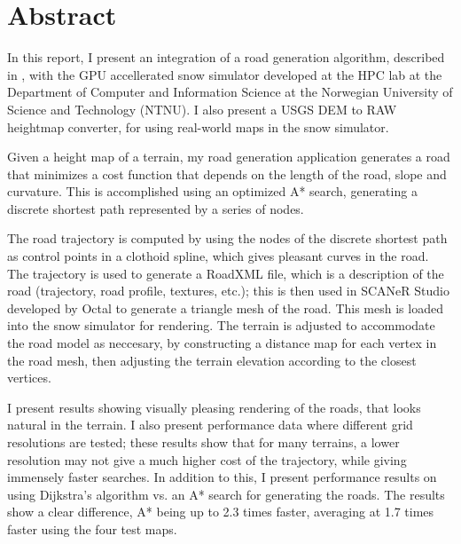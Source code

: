 \chapter*{Abstract}

In this report, I present an integration of a road generation algorithm, described in \cite{roadgen}, with the GPU accellerated snow simulator developed at the HPC lab at the Department of Computer and Information Science at the Norwegian University of Science and Technology (NTNU). I also present a USGS DEM to RAW heightmap converter, for using real-world maps in the snow simulator. 

Given a height map of a terrain, my road generation application generates a road that minimizes a cost function that depends on the length of the road, slope and curvature. This is accomplished using an optimized A* search, generating a discrete shortest path represented by a series of nodes. 

The road trajectory is computed by using the nodes of the discrete shortest path as control points in a clothoid spline, which gives pleasant curves in the road. The trajectory is used to generate a RoadXML file, which is a description of the road (trajectory, road profile, textures, etc.); this is then used in SCANeR Studio developed by Octal\cite{octalstudio} to generate a triangle mesh of the road. This mesh is loaded into the snow simulator for rendering. The terrain is adjusted to accommodate the road model as neccesary, by constructing a distance map for each vertex in the road mesh, then adjusting the terrain elevation according to the closest vertices.

I present results showing visually pleasing rendering of the roads, that looks natural in the terrain. I also present performance data where different grid resolutions are tested; these results show that for many terrains, a lower resolution may not give a much higher cost of the trajectory, while giving immensely faster searches. In addition to this, I present performance results on using Dijkstra's algorithm vs. an A* search for generating the roads. The results show a clear difference, A* being up to 2.3 times faster, averaging at 1.7 times faster using the four test maps.

